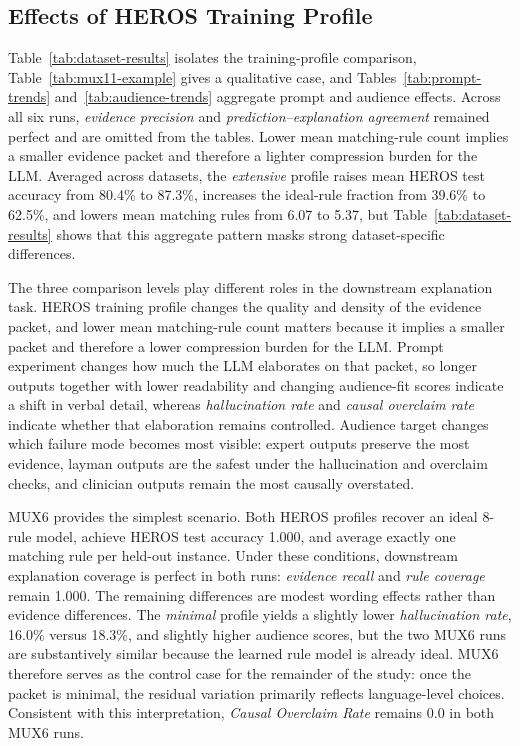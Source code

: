 \documentclass[sigconf]{acmart}
\begin{document}
\subsection{Effects of HEROS Training Profile}
Table~\ref{tab:dataset-results} isolates the training-profile comparison, Table~\ref{tab:mux11-example} gives a qualitative case, and Tables~\ref{tab:prompt-trends} and~\ref{tab:audience-trends} aggregate prompt and audience effects. Across all six runs, \emph{evidence precision} and \emph{prediction--explanation agreement} remained perfect and are omitted from the tables. Lower mean matching-rule count implies a smaller evidence packet and therefore a lighter compression burden for the LLM.
Averaged across datasets, the \emph{extensive} profile raises mean HEROS test accuracy from 80.4\% to 87.3\%, increases the ideal-rule fraction from 39.6\% to 62.5\%, and lowers mean matching rules from 6.07 to 5.37, but Table~\ref{tab:dataset-results} shows that this aggregate pattern masks strong dataset-specific differences.

The three comparison levels play different roles in the downstream explanation task. HEROS training profile changes the quality and density of the evidence packet, and lower mean matching-rule count matters because it implies a smaller packet and therefore a lower compression burden for the LLM. Prompt experiment changes how much the LLM elaborates on that packet, so longer outputs together with lower readability and changing audience-fit scores indicate a shift in verbal detail, whereas \emph{hallucination rate} and \emph{causal overclaim rate} indicate whether that elaboration remains controlled. Audience target changes which failure mode becomes most visible: expert outputs preserve the most evidence, layman outputs are the safest under the hallucination and overclaim checks, and clinician outputs remain the most causally overstated.


MUX6 provides the simplest scenario. Both HEROS profiles recover an ideal 8-rule model, achieve HEROS test accuracy 1.000, and average exactly one matching rule per held-out instance. Under these conditions, downstream explanation coverage is perfect in both runs: \emph{evidence recall} and \emph{rule coverage} remain 1.000. The remaining differences are modest wording effects rather than evidence differences. The \emph{minimal} profile yields a slightly lower \emph{hallucination rate}, 16.0\% versus 18.3\%, and slightly higher audience scores, but the two MUX6 runs are substantively similar because the learned rule model is already ideal. MUX6 therefore serves as the control case for the remainder of the study: once the packet is minimal, the residual variation primarily reflects language-level choices. Consistent with this interpretation, \emph{Causal Overclaim Rate} remains 0.0 in both MUX6 runs.
\end{document}
